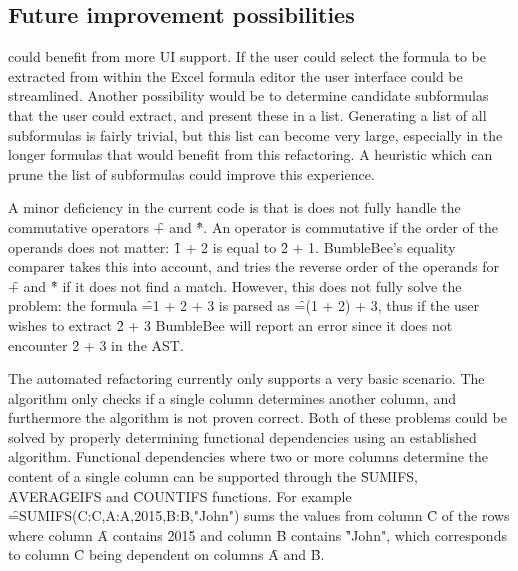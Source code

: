 \subsection{Future improvement possibilities}

 could benefit from more UI support.
If the user could select the formula to be extracted from within the Excel formula editor the user interface could be streamlined.
Another possibility would be to determine candidate subformulas that the user could extract, and present these in a list.
Generating a list of all subformulas is fairly trivial, but this list can become very large, especially in the longer formulas that would benefit from this refactoring.
A heuristic which can prune the list of subformulas could improve this experience.

A minor deficiency in the current  code is that is does not fully handle the commutative operators \f{+} and \f{*}.
An operator is commutative if the order of the operands does not matter: \f{1 + 2} is equal to \f{2 + 1}.
BumbleBee's equality comparer takes this into account, and tries the reverse order of the operands for \f{+} and \f{*} if it does not find a match.
However, this does not fully solve the problem: the formula \f{=1 + 2 + 3} is parsed as \f{=(1 + 2) + 3}, thus if the user wishes to extract \f{2 + 3} BumbleBee will report an error since it does not encounter \f{2 + 3} in the AST.

The  automated refactoring currently only supports a very basic scenario.
The algorithm only checks if a single column determines another column, and furthermore the algorithm is not proven correct.
Both of these problems could be solved by properly determining functional dependencies using an established algorithm.
Functional dependencies where two or more columns determine the content of a single column can be supported through the \f{SUMIFS}, \f{AVERAGEIFS} and \f{COUNTIFS} functions. For example \f{=SUMIFS(C:C,A:A,2015,B:B,"John")} sums the values from column \f{C} of the rows where column \f{A} contains \f{2015} and column \f{B} contains \f{"John"}, which corresponds to column \f{C} being dependent on columns \f{A} and \f{B}.